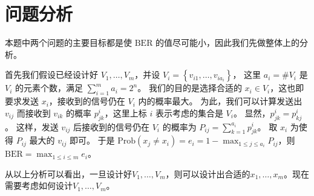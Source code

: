 \section{问题分析}

本题中两个问题的主要目标都是使 \(\mathrm{BER}\) 的值尽可能小，因此我们先做整体上的分析。

首先我们假设已经设计好 \(V_1,\dots,V_m\)，并设 \(V_i=\left\{v_{i1},\dots,v_{ia_i}\right\}\)，
这里 \(a_i=\#V_i\) 是 \(V_i\) 的元素个数，满足 \(\sum_{i=1}^m a_i=2^n\)。
我们的目的是选择合适的 \(x_i\in V_i\)，这也即要求发送 \(x_i\)，接收到的信号仍在 \(V_i\) 内的概率最大。
为此，我们可以计算发送出 \(v_{ij}\) 而接收到 \(v_{ik}\) 的概率 \(p^i_{jk}\)，这里上标 \(i\) 表示考虑的集合是 \(V_i\)。
显然，\(p^i_{jk}=p^i_{kj}\)。
这样，发送 \(v_{ij}\) 后接收到的信号仍在 \(V_i\) 的概率为 \(P_{ij}=\sum_{k=1}^{a_i}p^i_{jk}\)。
取 \(x_i\) 为使得 \(P_{ij}\) 最大的 \(v_{ij}\) 即可。
于是 \(\mathrm{Prob}\left(x_j\ne x_i\right)=e_i=1-\max_{1\le j\le a_i}P_{ij}\)，则 \(\mathrm{BER}=\max_{1\le i\le m}e_i\)。

从以上分析可以看出，一旦设计好$V_1,\dots,V_m$，则可以设计出合适的$x_1,\dots,x_m$。现在需要考虑如何设计$V_1,\dots,V_m$。
